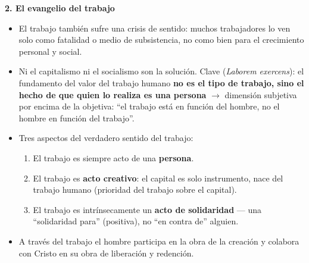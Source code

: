 \documentclass[10pt,a4paper]{article}
\begin{document}
\medskip\noindent \textbf{2. El evangelio del trabajo}\par\nopagebreak
\begin{itemize}
\item El trabajo también sufre una crisis de sentido: muchos trabajadores lo ven solo como fatalidad o medio de subsistencia, no como bien para el crecimiento personal y social.
\item Ni el capitalismo ni el socialismo son la solución. Clave (\textit{Laborem exercens}): el fundamento del valor del trabajo humano \textbf{no es el tipo de trabajo, sino el hecho de que quien lo realiza es una persona} $\rightarrow$ dimensión subjetiva por encima de la objetiva: ``el trabajo está en función del hombre, no el hombre en función del trabajo''.
\item Tres aspectos del verdadero sentido del trabajo:
\begin{enumerate}
\item El trabajo es siempre acto de una \textbf{persona}.
\item El trabajo es \textbf{acto creativo}: el capital es solo instrumento, nace del trabajo humano (prioridad del trabajo sobre el capital).
\item El trabajo es intrínsecamente un \textbf{acto de solidaridad} --- una ``solidaridad para'' (positiva), no ``en contra de'' alguien.
\end{enumerate}
\item A través del trabajo el hombre participa en la obra de la creación y colabora con Cristo en su obra de liberación y redención.
\end{itemize}
\end{document}
